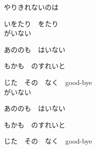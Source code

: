 {やりきれないのは

いをたり　をたり
\\

がいない

あののも　はいない

もかも　のすれいと

じた　その　なく　good-bye
\\

がいない

あののも　はいない

もかも　のすれいと

じた　その　なく　good-bye

}